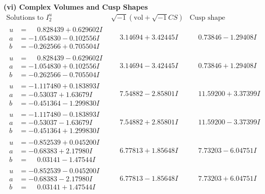 \documentclass[1p]{elsarticle_modified}
\theoremstyle{definition}
\newcommand{\I}{\sqrt{-1}}
\begin{document}
\newpage\flushleft \textbf{(vi) Complex Volumes and Cusp Shapes}
$$\begin{array}{c|c|c}  
\text{Solutions to }I^u_{2}& \I (\text{vol} + \sqrt{-1}CS) & \text{Cusp shape}\\
 \hline 
\begin{aligned}
u &= \phantom{-}0.828439 + 0.629602 I \\
a &= -1.054830 - 0.102556 I \\
b &= -0.262566 + 0.705504 I\end{aligned}
 & \phantom{-}3.14694 + 3.42445 I & \phantom{-}0.73846 - 1.29408 I \\ \hline\begin{aligned}
u &= \phantom{-}0.828439 - 0.629602 I \\
a &= -1.054830 + 0.102556 I \\
b &= -0.262566 - 0.705504 I\end{aligned}
 & \phantom{-}3.14694 - 3.42445 I & \phantom{-}0.73846 + 1.29408 I \\ \hline\begin{aligned}
u &= -1.117480 + 0.183893 I \\
a &= -0.53037 + 1.63679 I \\
b &= -0.451364 - 1.299830 I\end{aligned}
 & \phantom{-}7.54882 - 2.85801 I & \phantom{-}11.59200 + 3.37399 I \\ \hline\begin{aligned}
u &= -1.117480 - 0.183893 I \\
a &= -0.53037 - 1.63679 I \\
b &= -0.451364 + 1.299830 I\end{aligned}
 & \phantom{-}7.54882 + 2.85801 I & \phantom{-}11.59200 - 3.37399 I \\ \hline\begin{aligned}
u &= -0.852539 + 0.045200 I \\
a &= -0.68383 + 2.17980 I \\
b &= \phantom{-}0.03141 - 1.47544 I\end{aligned}
 & \phantom{-}6.77813 + 1.85648 I & \phantom{-}7.73203 - 6.04751 I \\ \hline\begin{aligned}
u &= -0.852539 - 0.045200 I \\
a &= -0.68383 - 2.17980 I \\
b &= \phantom{-}0.03141 + 1.47544 I\end{aligned}
 & \phantom{-}6.77813 - 1.85648 I & \phantom{-}7.73203 + 6.04751 I \\ \hline\begin{aligned}

\end{aligned}
\end{array}$$
\end{document}
